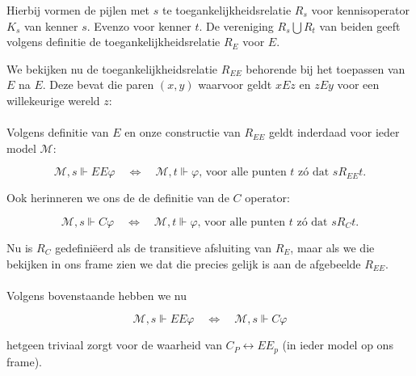 \documentclass[a4paper,11pt]{article}
\begin{document}
Hierbij vormen de pijlen met $s$ te toegankelijkheidsrelatie $R_{s}$ voor
kennisoperator $K_{s}$ van kenner $s$. Evenzo voor kenner $t$. De vereniging
$R_{s} \bigcup R_{t}$ van beiden geeft volgens definitie de
toegankelijkheidsrelatie $R_{E}$ voor $E$.

We bekijken nu de toegankelijkheidsrelatie $R_{EE}$ behorende bij het
toepassen van $E$ na $E$. Deze bevat die paren $(x,y)$ waarvoor geldt $xEz$ en
$zEy$ voor een willekeurige wereld $z$:\\[1em]

\\[1em]

Volgens definitie van $E$ en onze constructie van $R_{EE}$ geldt inderdaad
voor ieder model $\mathcal{M}$:

\begin{displaymath}
\mathcal{M},s \Vdash EE \varphi \quad \Longleftrightarrow \quad
\mathcal{M},t \Vdash \varphi \mbox{, voor alle punten $t$ z\'o dat $sR_{EE}t$.}
\end{displaymath}

Ook herinneren we ons de de definitie van de $C$ operator:

\begin{displaymath}
\mathcal{M},s \Vdash C \varphi \quad \Longleftrightarrow \quad
\mathcal{M},t \Vdash \varphi \mbox{, voor alle punten $t$ z\'o dat $sR_{C}t$.}
\end{displaymath}

Nu is $R_{C}$ gedefini\"eerd als de transitieve afsluiting van $R_{E}$, maar
als we die bekijken in ons frame zien we dat die precies gelijk is aan de
afgebeelde $R_{EE}$.

\paragraph{}

Volgens bovenstaande hebben we nu

\begin{displaymath}
\mathcal{M},s \Vdash EE \varphi \quad \Longleftrightarrow \quad
\mathcal{M},s \Vdash C \varphi
\end{displaymath}

hetgeen triviaal zorgt voor de waarheid van $C_{P} \leftrightarrow EE_{p}$
(in ieder model op ons frame).
\end{document}
